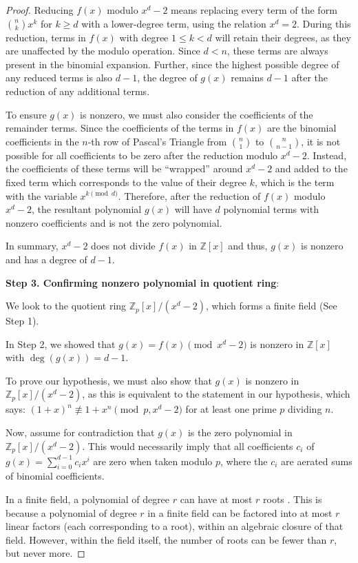 \documentclass{article}
\theoremstyle{plain}
\theoremstyle{definition}
\begin{document}
\begin{proof}
Reducing $f(x)$ modulo $x^d - 2$ means replacing every term of the form $\binom{n}{k} x^k$ for $k \geq d$ with a lower-degree term, using the relation $x^d = 2$. During this reduction, terms in $f(x)$ with degree $1 \leq k < d$ will retain their degrees, as they are unaffected by the modulo operation. Since $d < n$, these terms are always present in the binomial expansion. Further, since the highest possible degree of any reduced terms is also $d-1$, the degree of $g(x)$ remains $d-1$ after the reduction of any additional terms.

To ensure $g(x)$ is nonzero, we must also consider the coefficients of the remainder terms. Since the coefficients of the terms in $f(x)$ are the binomial coefficients in the $n$-th row of Pascal's Triangle from $\binom{n}{1}$ to $\binom{n}{n-1}$, it is not possible for all coefficients to be zero after the reduction modulo $x^d - 2$. Instead, the coefficients of these terms will be ``wrapped'' around $x^d - 2$ and added to the fixed term which corresponds to the value of their degree $k$, which is the term with the variable $x^{k \pmod{d}}$. Therefore, after the reduction of $f(x)$ modulo $x^d - 2$, the resultant polynomial $g(x)$ will have $d$ polynomial terms with nonzero coefficients and is not the zero polynomial.

In summary, $x^d-2$ does not divide $f(x)$ in $\mathbb{Z}[x]$ and thus, $g(x)$ is nonzero and has a degree of $d-1$.

\textbf{Step 3. Confirming nonzero polynomial in quotient ring}:

We look to the quotient ring $\mathbb{Z}_p[x]/(x^d - 2)$, which forms a finite field (See Step 1).

In Step 2, we showed that $g(x) = f(x) \pmod{x^d-2}$ is nonzero in $\mathbb{Z}[x]$ with $\deg(g(x)) = d-1$.

To prove our hypothesis, we must also show that $g(x)$ is nonzero in $\mathbb{Z}_p[x]/(x^d - 2)$, as this is equivalent to the statement in our hypothesis, which says: $(1 + x)^n \not\equiv 1 + x^n \pmod{p, x^d-2}$ for at least one prime $p$ dividing $n$.

Now, assume for contradiction that $g(x)$ is the zero polynomial in $\mathbb{Z}_p[x]/(x^d - 2)$. This would necessarily imply that all coefficients $c_i$ of $g(x) = \sum_{i=0}^{d-1} c_i x^i$ are zero when taken modulo $p$, where the $c_i$ are aerated sums of binomial coefficients.

In a finite field, a polynomial of degree $r$ can have at most $r$ roots \cite{dummit2004abstractalgebra}. This is because a polynomial of degree $r$ in a finite field can be factored into at most $r$ linear factors (each corresponding to a root), within an algebraic closure of that field. However, within the field itself, the number of roots can be fewer than $r$, but never more.


\end{proof}
\end{document}
